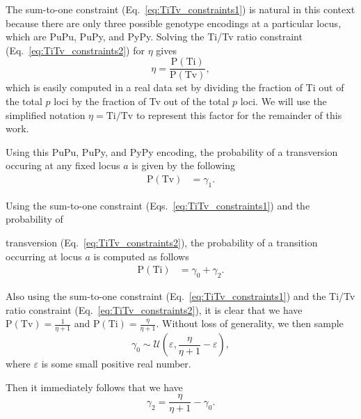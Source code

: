 \documentclass[aoas]{imsart}
\begin{document}
The sum-to-one constraint (Eq.~\ref{eq:TiTv_constraints1}) is natural in this context because there are only three possible genotype encodings at a particular locus, which are PuPu, PuPy, and PyPy. Solving the Ti/Tv ratio constraint (Eq.~\ref{eq:TiTv_constraints2}) for $\eta$ gives
%
\[
\eta = \frac{\text{P}(\text{Ti})}{\text{P}(\text{Tv})},
\]
%
which is easily computed in a real data set by dividing the fraction of Ti out of the total $p$ loci by the fraction of Tv out of the total $p$ loci. We will use the simplified notation $\eta=\text{Ti}/\text{Tv}$ to represent this factor for the remainder of this work.

Using this PuPu, PuPy, and PyPy encoding, the probability of a transversion occuring at any fixed locus $a$ is given by the following
%
\begin{equation}\label{eq:prob_Tv}
\begin{aligned}
\text{P}(\text{Tv}) &= \gamma_1.
\end{aligned}
\end{equation}

Using the sum-to-one constraint (Eqs.~\ref{eq:TiTv_constraints1}) and the probability of

\noindent transversion (Eq.~\ref{eq:TiTv_constraints2}), the probability of a transition occurring at locus $a$ is computed as follows
%
\begin{equation}\label{eq:prob_Ti}
\begin{aligned}
\text{P}(\text{Ti}) &= \gamma_0 + \gamma_2.
\end{aligned}
\end{equation}

Also using the sum-to-one constraint (Eq.~\ref{eq:TiTv_constraints1}) and the Ti/Tv ratio constraint (Eq.~\ref{eq:TiTv_constraints2}), it is clear that we have $\text{P}(\text{Tv}) = \frac{1}{\eta + 1}$ and $\text{P}(\text{Ti}) = \frac{\eta}{\eta + 1}$. Without loss of generality, we then sample 
%
\begin{equation}\label{eq:gamma0}
\gamma_0 \sim \mathcal{U}\left(\varepsilon,\frac{\eta}{\eta + 1} - \varepsilon\right),
\end{equation}
%
where $\varepsilon$ is some small positive real number.

Then it immediately follows that we have 
%
\begin{equation}\label{eq:gamma2}
\gamma_2 = \frac{\eta}{\eta + 1} - \gamma_0.
\end{equation}
\end{document}
